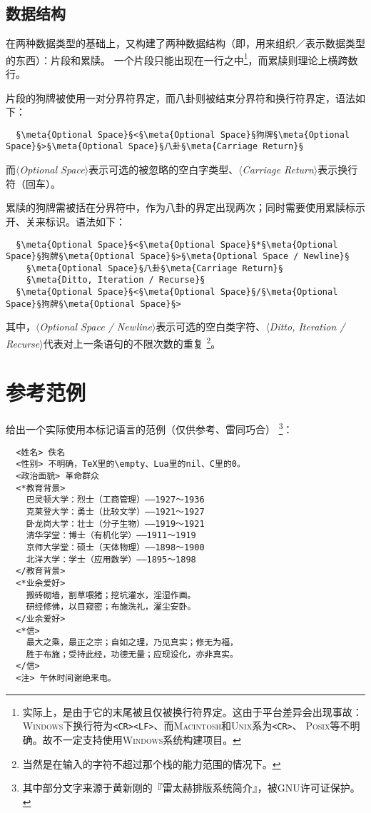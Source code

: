 \documentclass[twoside]{ltjsarticle}
\def\meta#1{{\small\normalfont\rmfamily\itshape$\langle$#1\/$\rangle$}}
\begin{document}
\subsection{数据结构}
在两种数据类型的基础上，又构建了两种数据结构（即，用来组织／表示数据类型的东西）：片段和累牍。
一个片段只能出现在一行之中\footnote{实际上，是由于它的末尾被且仅被换行符界定。这由于平台差异会出现事故：
{\scshape Windows}下换行符为\texttt{<CR><LF>}、而{\scshape Macintosh}和{\scshape Unix}系为\texttt{<CR>}、
{\scshape Posix}等不明确。故不一定支持使用{\scshape Windows}系统构建项目。}，而累牍则理论上横跨数行。\par
片段的狗牌被使用一对分界符界定，而八卦则被结束分界符和换行符界定，语法如下：
\begin{lstlisting}
  §\meta{Optional Space}§<§\meta{Optional Space}§狗牌§\meta{Optional Space}§>§\meta{Optional Space}§八卦§\meta{Carriage Return}§
\end{lstlisting}
而\meta{Optional Space}表示可选的被忽略的空白字类型、\meta{Carriage Return}表示换行符（回车）。\par
累牍的狗牌需被括在分界符中，作为八卦的界定出现两次；同时需要使用累牍标示开、关来标识。语法如下：
\begin{lstlisting}
  §\meta{Optional Space}§<§\meta{Optional Space}§*§\meta{Optional Space}§狗牌§\meta{Optional Space}§>§\meta{Optional Space / Newline}§
    §\meta{Optional Space}§八卦§\meta{Carriage Return}§
    §\meta{Ditto, Iteration / Recurse}§
  §\meta{Optional Space}§<§\meta{Optional Space}§/§\meta{Optional Space}§狗牌§\meta{Optional Space}§>
\end{lstlisting}
其中，\meta{Optional Space / Newline}表示可选的空白类字符、\meta{Ditto, Iteration / Recurse}代表对上一条语句的不限次数的重复
\footnote{当然是在输入的字符不超过那个栈的能力范围的情况下。}。

\section{参考范例}
给出一个实际使用本标记语言的范例（仅供参考、雷同巧合）
\footnote{其中部分文字来源于黄新刚的『雷太赫排版系统简介』，被{\scshape GNU}许可证保护。}：
\begin{lstlisting}
  <姓名> 佚名
  <性别> 不明确，TeX里的\empty、Lua里的nil、C里的0。
  <政治面貌> 革命群众
  <*教育背景>
    巴灵顿大学：烈士（工商管理）——1927～1936
    克莱登大学：勇士（比较文学）——1921～1927
    卧龙岗大学：壮士（分子生物）——1919～1921
    清华学堂：博士（有机化学）——1911～1919
    京师大学堂：硕士（天体物理）——1898～1900
    北洋大学：学士（应用数学）——1895～1898
  </教育背景>
  <*业余爱好>
    搬砖砌墙，割草喂猪；挖坑灌水，淫湿作画。
    研经修佛，以目窥密；布施洗礼，濯尘安卧。
  </业余爱好>
  <*信>
    最大之乘，最正之宗；自如之理，乃见真实；修无为福，
    胜于布施；受持此经，功德无量；应现设化，亦非真实。
  </信>
  <注> 午休时间谢绝来电。
\end{lstlisting}
\end{document}
